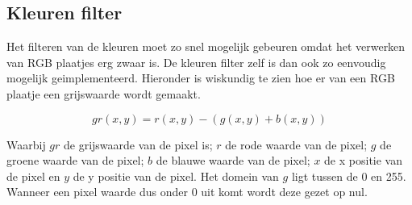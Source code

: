 \subsection{Kleuren filter}
\label{sub:kleurfilt}

Het filteren van de kleuren moet zo snel mogelijk gebeuren omdat het verwerken van
RGB plaatjes erg zwaar is. De kleuren filter zelf is dan ook zo eenvoudig mogelijk
geimplementeerd. Hieronder is wiskundig te zien hoe er van een RGB plaatje een
grijswaarde wordt gemaakt.

\[ gr(x, y) = r(x, y) - (g(x, y) + b(x, y)) \]

Waarbij $gr$ de grijswaarde van de pixel is; $r$ de rode waarde van de pixel;
$g$ de groene waarde van de pixel; $b$ de blauwe waarde van de pixel; $x$ de x
positie van de pixel en $y$ de y positie van de pixel. Het domein van $g$ ligt
tussen de 0 en 255. Wanneer een pixel waarde dus onder 0 uit komt wordt deze
gezet op nul.
